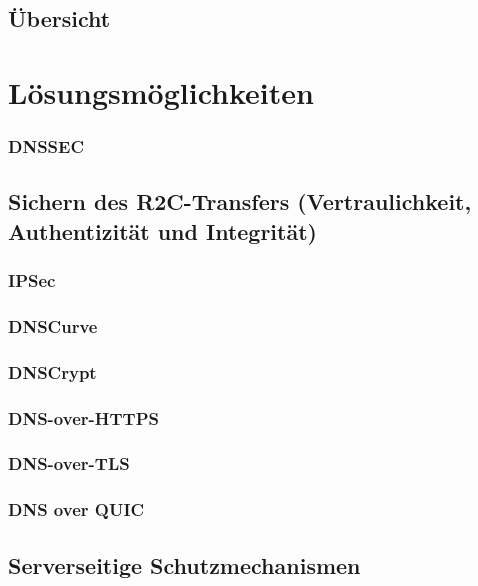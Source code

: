 \section{Übersicht}
\label{BedrohungenÜbersicht}

\chapter{Lösungsmöglichkeiten}

\subsection{DNSSEC}

\section{Sichern des R2C-Transfers (Vertraulichkeit, Authentizität und Integrität)}

\subsection{IPSec}

\subsection{DNSCurve}

\subsection{DNSCrypt}

\subsection{DNS-over-HTTPS}

\subsection{DNS-over-TLS}

\subsection{DNS over QUIC}

\section{Serverseitige Schutzmechanismen}

